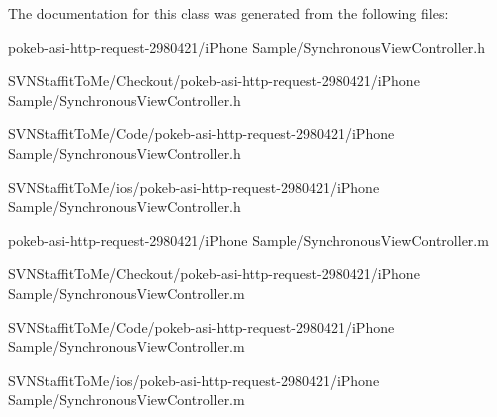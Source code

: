 \-The documentation for this class was generated from the following files\-:\begin{DoxyCompactItemize}
\item 
pokeb-\/asi-\/http-\/request-\/2980421/i\-Phone Sample/\-Synchronous\-View\-Controller.\-h\item 
\-S\-V\-N\-Staffit\-To\-Me/\-Checkout/pokeb-\/asi-\/http-\/request-\/2980421/i\-Phone Sample/\-Synchronous\-View\-Controller.\-h\item 
\-S\-V\-N\-Staffit\-To\-Me/\-Code/pokeb-\/asi-\/http-\/request-\/2980421/i\-Phone Sample/\-Synchronous\-View\-Controller.\-h\item 
\-S\-V\-N\-Staffit\-To\-Me/ios/pokeb-\/asi-\/http-\/request-\/2980421/i\-Phone Sample/\-Synchronous\-View\-Controller.\-h\item 
pokeb-\/asi-\/http-\/request-\/2980421/i\-Phone Sample/\-Synchronous\-View\-Controller.\-m\item 
\-S\-V\-N\-Staffit\-To\-Me/\-Checkout/pokeb-\/asi-\/http-\/request-\/2980421/i\-Phone Sample/\-Synchronous\-View\-Controller.\-m\item 
\-S\-V\-N\-Staffit\-To\-Me/\-Code/pokeb-\/asi-\/http-\/request-\/2980421/i\-Phone Sample/\-Synchronous\-View\-Controller.\-m\item 
\-S\-V\-N\-Staffit\-To\-Me/ios/pokeb-\/asi-\/http-\/request-\/2980421/i\-Phone Sample/\-Synchronous\-View\-Controller.\-m\end{DoxyCompactItemize}
